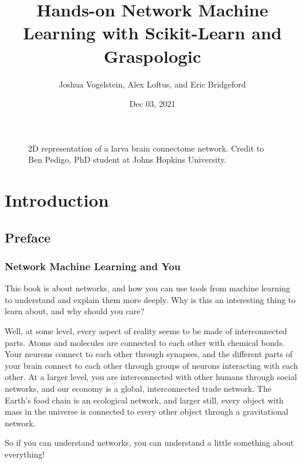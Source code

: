 \documentclass[letterpaper,10pt,english]{jupyterBook}
\title{Hands-on Network Machine Learning with Scikit-Learn and Graspologic}
\date{Dec 03, 2021}
\author{Joshua Vogelstein, Alex Loftus, and Eric Bridgeford}
\let\sphinxpxdimen\pdfpxdimen\else\newdimen\sphinxpxdimen
\begin{document}
\pagestyle{empty}
\sphinxmaketitle
\pagestyle{plain}
\sphinxtableofcontents
\pagestyle{normal}
\label{\detokenize{coverpage::doc}}


\begin{figure}[htbp]
\centering
\capstart

\noindent\sphinxincludegraphics[height=700\sphinxpxdimen]{{umap_pedigo_small}.jpg}
\caption{2D representation of a  larva brain connectome network. Credit to Ben Pedigo, PhD student at Johns Hopkins University.}\label{\detokenize{coverpage:maggot-connectome}}\end{figure}


\part{Introduction}


\chapter{Preface}
\label{\detokenize{introduction/preface:preface}}\label{\detokenize{introduction/preface::doc}}

\section{Network Machine Learning and You}
\label{\detokenize{introduction/preface:network-machine-learning-and-you}}
\sphinxAtStartPar
This book is about networks, and how you can use tools from machine learning to understand and explain them more deeply. Why is this an interesting thing to learn about, and why should you care?

\sphinxAtStartPar
Well, at some level, every aspect of reality seems to be made of interconnected parts. Atoms and molecules are connected to each other with chemical bonds. Your neurons connect to each other through synapses, and the different parts of your brain connect to each other through groups of neurons interacting with each other. At a larger level, you are interconnected with other humans through social networks, and our economy is a global, interconnected trade network. The Earth’s food chain is an ecological network, and larger still, every object with mass in the universe is connected to every other object through a gravitational network.

\sphinxAtStartPar
So if you can understand networks, you can understand a little something about everything!
\end{document}
